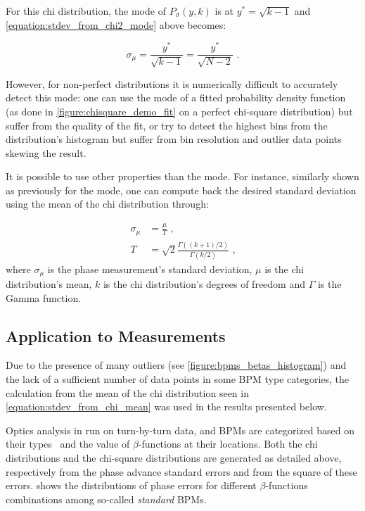 For this chi distribution, the mode of \(P_{\sigma}(y , k)\) is at \(y^*=\sqrt{k-1}\) and \cref{equation:stdev_from_chi2_mode} above becomes:

\begin{equation}
    \sigma_{\mu} = \frac{y^*}{\sqrt{k - 1}} = \frac{y^*}{\sqrt{N - 2}} \text{ .}
    \label{equation:stdev_from_mode}
\end{equation}

However, for non-perfect distributions it is numerically difficult to accurately detect this mode: one can use the mode of a fitted probability density function (as done in \cref{figure:chisquare_demo_fit} on a perfect chi-square distribution) but suffer from the quality of the fit, or try to detect the highest bins from the distribution's histogram but suffer from bin resolution and outlier data points skewing the result.

It is possible to use other properties than the mode.
For instance, similarly shown as previously for the mode, one can compute back the desired standard deviation using the mean of the chi distribution through:

\begin{equation}
	\begin{aligned}
        \sigma_{\mu} &= \frac{\mu}{T} \text{ ,} \\
        T            &= \sqrt{2} \frac{\Gamma((k + 1) / 2)}{\Gamma(k / 2)} \text{ ,}
	\end{aligned}	
    \label{equation:stdev_from_chi_mean}
\end{equation}
where \(\sigma_{\mu}\) is the phase measurement's standard deviation, \(\mu\) is the chi distribution's mean, \(k\) is the chi distribution's degrees of freedom and \(\Gamma\) is the Gamma function.

\subsection{Application to Measurements}

Due to the presence of many outliers (see \cref{figure:bpms_betas_histogram}) and the lack of a sufficient number of data points in some BPM type categories, the calculation from the mean of the chi distribution seen in \cref{equation:stdev_from_chi_mean} was used in the results presented below.

Optics analysis in run on turn-by-turn data, and BPMs are categorized based on their types~\cite{CERN:Equipment_Codes} and the value of \(\beta\)-functions at their locations.
Both the chi distributions and the chi-square distributions are generated as detailed above, respectively from the phase advance standard errors and from the square of these errors.
 shows the distributions of phase errors for different \(\beta\)-functions combinations among so-called \textit{standard} BPMs.

